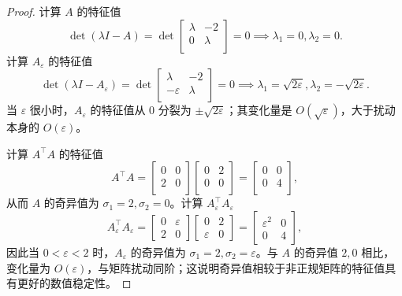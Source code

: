 \begin{proof}
    计算 $A$ 的特征值
    \[
        \det \left(\lambda I - A\right) = \det\begin{bmatrix}
            \lambda & -2 \\
            0 & \lambda \\
        \end{bmatrix} = 0 \implies \lambda_1 = 0, \lambda_2 = 0.
    \]
    计算 $A_\varepsilon$ 的特征值
    \[
        \det \left(\lambda I - A_\varepsilon\right) = \det\begin{bmatrix}
            \lambda & -2 \\
            -\varepsilon & \lambda \\
        \end{bmatrix} = 0 \implies \lambda_1 = \sqrt{2\varepsilon}, \lambda_2 = -\sqrt{2\varepsilon}.
    \]
    当 $\varepsilon$ 很小时，$A_\varepsilon$ 的特征值从 $0$ 分裂为 $\pm\sqrt{2\varepsilon}$；其变化量是 $O(\sqrt{\varepsilon})$，大于扰动本身的 $O(\varepsilon)$。

    计算 $A^\top A$ 的特征值
    \[
        A^\top A = \begin{bmatrix}
            0 & 0 \\
            2 & 0 \\
        \end{bmatrix} \begin{bmatrix}
            0 & 2 \\
            0 & 0 \\
        \end{bmatrix} = \begin{bmatrix}
            0 & 0 \\
            0 & 4 \\
        \end{bmatrix},
    \]
    从而 $A$ 的奇异值为 $\sigma_1 = 2, \sigma_2 = 0$。计算 $A_\varepsilon^\top A_\varepsilon$
    \[
        A_\varepsilon^\top A_\varepsilon =
        \begin{bmatrix}
            0 & \varepsilon \\
            2 & 0
        \end{bmatrix}
        \begin{bmatrix}
            0 & 2 \\
            \varepsilon & 0
        \end{bmatrix}
        =
        \begin{bmatrix}
            \varepsilon^2 & 0 \\
            0 & 4
        \end{bmatrix},
    \]
    因此当 $0<\varepsilon<2$ 时，$A_\varepsilon$ 的奇异值为 $\sigma_1=2,\sigma_2=\varepsilon$。与 $A$ 的奇异值 $2,0$ 相比，变化量为 $O(\varepsilon)$，与矩阵扰动同阶；这说明奇异值相较于非正规矩阵的特征值具有更好的数值稳定性。
\end{proof}
